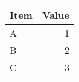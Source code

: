 \begin{tabular}{lr}
\toprule
Item & Value \\
\midrule
A & 1 \\
B & 2 \\
C & 3 \\
\bottomrule
\end{tabular}
